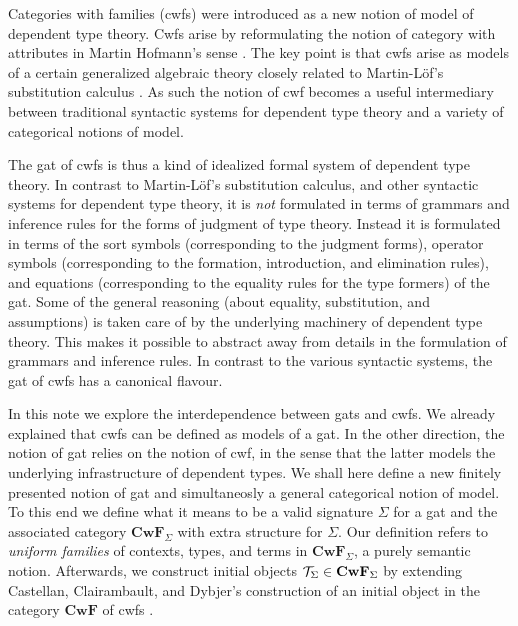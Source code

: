\documentclass{lmcs}
\def\Cwf{\mathbf{CwF}}
\begin{document}
Categories with families (cwfs) \cite{dybjer:torino} were introduced as a new notion of model of dependent type theory. Cwfs arise by reformulating the notion of category with attributes in Martin Hofmann's sense \cite{hofmann:csl}. The key point is that cwfs arise as models of a certain generalized algebraic theory closely related to Martin-Löf's substitution calculus \cite{martinlof:gbg92}. As such the notion of cwf becomes a useful intermediary between traditional syntactic systems for dependent type theory and a variety of categorical notions of model.

The gat of cwfs is thus a kind of idealized formal system of dependent type theory. In contrast to Martin-Löf's substitution calculus, and other syntactic systems for dependent type theory, it is {\em not} formulated in terms of grammars and inference rules for the forms of judgment of type theory. Instead it is formulated in terms of the sort symbols (corresponding to the judgment forms), operator symbols (corresponding to the formation, introduction, and elimination rules), and equations (corresponding to the equality rules for the type formers) of the gat. Some of the general reasoning (about equality, substitution, and assumptions) is taken care of by the underlying machinery of dependent type theory. This makes it possible to abstract away from details in the formulation of grammars and inference rules. In contrast to the various syntactic systems, the gat of cwfs has a canonical flavour. 

In this note we explore the interdependence between gats and cwfs. We already explained that cwfs can be defined as models of a gat. 
In the other direction, the notion of gat relies on the notion of cwf, in the sense that the latter models the underlying infrastructure of dependent types. We shall here define a new finitely presented notion of gat and simultaneosly a general categorical notion of model. To this end we define what it means to be a valid signature $\Sigma$ for a gat and the associated category $\Cwf_\Sigma$ with extra structure for $\Sigma$. Our definition refers to {\em uniform families} of contexts, types, and terms in $\Cwf_\Sigma$, a purely semantic notion. Afterwards, we construct initial objects $\T_\Sigma \in \Cwf_\Sigma$ by extending Castellan, Clairambault, and Dybjer's  construction of an initial object in the category $\Cwf$ of cwfs \cite{castellan:tlca2015,castellan:lmcs}.
\end{document}
